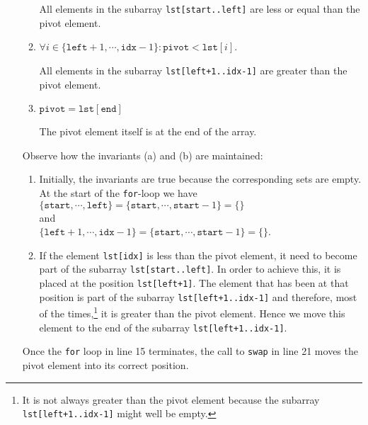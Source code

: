\begin{enumerate}
\begin{enumerate}
            All elements in the subarray \texttt{lst[start..left]} are less or equal than the pivot element.
      \item $\forall i \in \{ \mathtt{left}+1,\cdots,\mathtt{idx}-1\}:\mathtt{pivot} < \mathtt{lst}[i]$.

            All elements in the subarray \texttt{lst[left+1..idx-1]} are greater than the pivot
            element.
      \item $\texttt{pivot} = \mathtt{lst[end]}$

            The pivot element itself is at the end of the array.
      \end{enumerate}
      Observe how the invariants (a) and (b) are maintained:
      \begin{enumerate}
      \item Initially, the invariants are true because the corresponding sets are empty.
            At the start of the \texttt{for}-loop we have
            \\[0.2cm]
            \hspace*{1.3cm}
            $\{ \mathtt{start}, \cdots, \mathtt{left} \} = \{ \mathtt{start}, \cdots, \mathtt{start} - 1\} = \{\}$
            \\
            and
            \\
            \hspace*{1.3cm}
            $\{ \mathtt{left}+1,\cdots,\mathtt{idx}-1\} =  \{ \mathtt{start},\cdots,\mathtt{start}-1\}=\{\}$.
      \item If the element \texttt{lst[idx]} is less than the
            pivot element, it need to become part of the subarray \texttt{lst[start..left]}.  In order to
            achieve this, it is placed at the position \texttt{lst[left+1]}.  The element that has been at
            that position is part of the subarray \texttt{lst[left+1..idx-1]} and therefore, most of the times,\footnote{It is not always greater than the pivot element
      because the subarray \texttt{lst[left+1..idx-1]} might well be empty.}
            it is greater than the pivot element.  
            Hence we move this element to the end of the subarray \texttt{lst[left+1..idx-1]}.
      \end{enumerate}
      Once the \texttt{for} loop in line 15 terminates, the call to \texttt{swap} in line 21 moves
      the pivot element into its correct position.  
\end{enumerate}


